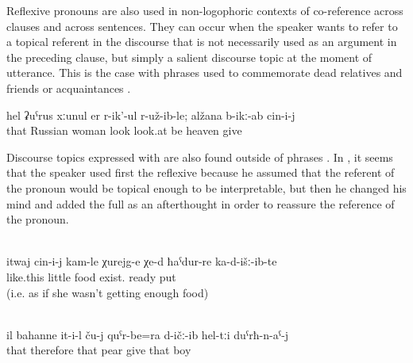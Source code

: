 Reflexive pronouns are also used in non-logophoric contexts of co-reference across clauses and across sentences. They can occur when the speaker wants to refer to a topical referent in the discourse that is not necessarily used as an argument in the preceding clause, but simply a salient discourse topic at the moment of utterance. This is the case with  phrases used to commemorate dead relatives and friends or acquaintances .
%
\begin{exe}
	\ex	\label{ex:It turned out that the Russian woman had looked}
	\gll	hel	ʡuˁrus	xːunul	er	r-ik'-ul	r-už-ib-le;	alžana	b-ikː-ab	cin-i-j\\
		that	Russian	woman	look	look.at	be	heaven	give	\\
	\glt	{} 
\end{exe}

Discourse topics expressed with  are also found outside of  phrases . In , it seems that the speaker used first the reflexive because he assumed that the referent of the pronoun would be topical enough to be interpretable, but then he changed his mind and added the full  as an afterthought in order to reassure the reference of the pronoun.
%
\begin{exe}
	\\	\label{ex:‎Like this there is a little food prepared and served for her}
	\gll	itwaj	cin-i-j	kam-le	χurejg-e	χe-d	ħaˁdur-re	ka-d-išː-ib-te\\
		like.this		little	food	exist.	ready	put\\
	\glt	{} (i.e. as if she wasn't getting enough food)

	\\	\label{ex:therefore he gave them pears, to the boys}
	\gll	il	bahanne	it-i-l	ču-j	quˁr-be=ra	d-ičː-ib	hel-tːi	duˁrħ-n-aˁ-j\\
		that	therefore	that		pear	give	that	boy\\
	\glt	{}
\end{exe}


